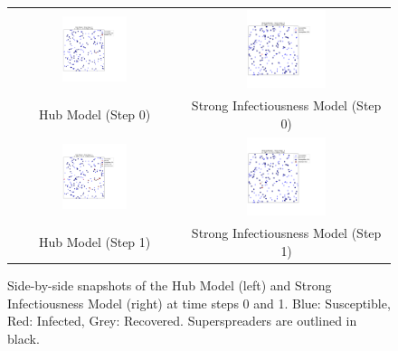 \documentclass{article}
\begin{document}
\begin{figure}[!htbp]
    \centering
    \begin{tabular}{cc}
        \includegraphics[width=0.4\textwidth]{fig/sir_hub_step_0.png} &
        \includegraphics[width=0.4\textwidth]{fig/sir_strong_step_0.png} \\
        Hub Model (Step 0) & Strong Infectiousness Model (Step 0) \\
        \includegraphics[width=0.4\textwidth]{fig/sir_hub_step_1.png} &
        \includegraphics[width=0.4\textwidth]{fig/sir_strong_step_1.png} \\
        Hub Model (Step 1) & Strong Infectiousness Model (Step 1) \\
    \end{tabular}
    \caption{Side-by-side snapshots of the Hub Model (left) and Strong Infectiousness Model (right) at time steps 0 and 1. Blue: Susceptible, Red: Infected, Grey: Recovered. Superspreaders are outlined in black.}
    \label{fig:side_by_side_snapshots_1}
\end{figure}
\end{document}
